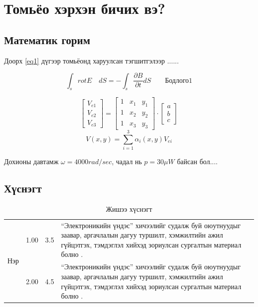 \chapter{Томьёо хэрхэн бичих вэ?} %

\label{Chapter5} %
\pagecolor{white}

\section{Математик горим}

Доорх \ref{eq1} дүгээр томьёонд харуулсан тэгшитгэлээр ......\cite{zorigt1}
 

\begin{equation}
\int_{s}^{}rot E \quad dS=-\int_{s}\frac{\partial B}{\partial t}dS  \qquad \textit{Бодлого1}
\label{eq1}
\end{equation}

\[ 
\begin{bmatrix}
V_{e1} \\
V_{e2} \\
V_{e3} 
\end{bmatrix}=
\begin{bmatrix}
1 & x_1 & y_1 \\
1 & x_2 & y_2 \\
1 & x_3 & y_3
\end{bmatrix}
\cdot \begin{bmatrix}
a \\
b \\
c
\end{bmatrix}\]
\[
V(x,y)=\sum_{i=1}^{3}\alpha_i(x,y)V_{ei}
\]


Дохионы давтамж $\omega=4000 rad/sec$, чадал нь $p=30\mu W$ байсан бол.... \cite{uguulel}


\section{Хүснэгт}

\begin{table}[!ht]
	\centering
	\caption{Жишээ хүснэгт}
	\label{table1}
	
	\begin{tabular}{|p{2cm}|p{2cm}|p{2cm}|p{7.5cm}|}
	\hline
		\multirow{2}{*}{Нэр} & 1.00 & 3.5& “Электроникийн үндэс” хичээлийг судалж буй оюутнуудыг заавар, аргачлалын дагуу туршилт, хэмжилтийн ажил гүйцэтгэх, тэмдэглэл хийхэд зориулсан сургалтын материал болно \cite{online1}. \\
	  & 2.00 & 4.5& “Электроникийн үндэс” хичээлийг судалж буй оюутнуудыг заавар, аргачлалын дагуу туршилт, хэмжилтийн ажил гүйцэтгэх, тэмдэглэл хийхэд зориулсан сургалтын материал болно \cite{vhdl}. \\
	\hline
\end{tabular}	

\end{table}


	
